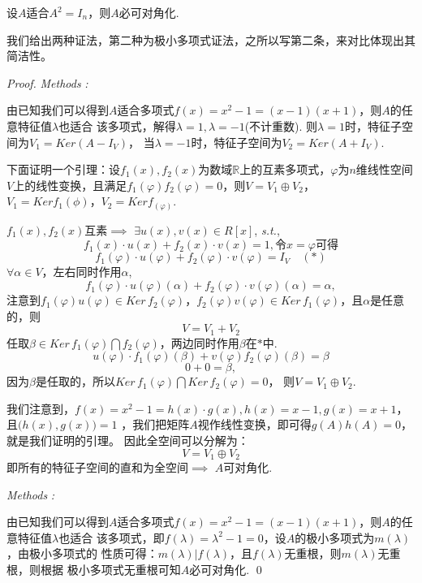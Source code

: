 \begin{proposition}
	设$A$适合$A^2=I_n$，则$A$必可对角化.
\end{proposition}

我们给出两种证法，第二种为极小多项式证法，之所以写第二条，来对比体现出其简洁性。

\begin{proof}
	\emph{Methods\,\,\uppercase\expandafter{}:}

	由已知我们可以得到$A$适合多项式$f(x)=x^2-1=(x-1)(x+1)$，则$A$的任意特征值$\lambda$也适合
	该多项式，解得$\lambda=1,\lambda=-1$(不计重数). 则$\lambda=1$时，特征子空间为$V_1=Ker(A-I_V)$，
	当$\lambda=-1$时，特征子空间为$V_2=Ker (A + I_V)$.

	下面证明一个引理：设$f_1(x),f_2(x)$为数域$\mathbb{R}$上的互素多项式，$\varphi$为$n$维线性空间
	$V$上的线性变换，且满足$f_1(\varphi) f_2(\varphi)=0$，则$V = V_1 \oplus V_2$，$V_1 = Ker f_1(\phi)，
	V_2 = Ker f_(\varphi)$.

	$f_1(x), f_2(x)$互素$\implies $ $\exists u(x),v(x) \in R[x]$, \emph{s.t.},
	$$
	    f_1(x) \cdot u(x) + f_2(x) \cdot v(x) = 1, \text{令$x=\varphi$可得}
	$$
	$$
	f_1(\varphi) \cdot u(\varphi) + f_2(\varphi) \cdot v(\varphi) = I_V  \quad (\ast )
	$$
	$\forall \alpha \in V$，左右同时作用$\alpha$,
	$$
	f_1(\varphi) \cdot u(\varphi)(\alpha) + f_2(\varphi) \cdot v(\varphi)(\alpha) = \alpha,
	$$
	注意到$f_1(\varphi) u(\varphi) \in Ker \, f_2(\varphi)$，$f_2(\varphi) v(\varphi) \in
	Ker \, f_1(\varphi)$，且$\alpha$是任意的，则
	$$
		V = V_1 + V_2
	$$
	任取$\beta \in Ker \, f_1(\varphi) \bigcap f_2(\varphi)$，两边同时作用$\beta$在$\ast $中.
	$$
		u(\varphi) \cdot f_1(\varphi) (\beta) + v(\varphi) f_2(\varphi) (\beta) = \beta
	$$
	$$
		0 + 0 = \beta,
	$$
	因为$\beta$是任取的，所以$Ker \, f_1(\varphi) \bigcap Ker \, f_2(\varphi)=0$，
	则$V=V_1 \oplus  V_2$.

	我们注意到，$f(x)=x^2-1=h(x) \cdot g(x), h(x)=x-1, g(x)=x+1$，且$\bigl( h(x), g(x) \bigr)=1$
	，我们把矩阵$A$视作线性变换，即可得$g(A)h(A)=0$，就是我们证明的引理。 因此全空间可以分解为：
	$$
		V = V_1 \oplus V_2
	$$
	即所有的特征子空间的直和为全空间$\implies $ $A$可对角化.


	\emph{Methods\,\,\uppercase\expandafter{}:}

	由已知我们可以得到$A$适合多项式$f(x)=x^2-1=(x-1)(x+1)$，则$A$的任意特征值$\lambda$也适合
	该多项式，即$f(\lambda)=\lambda^2-1=0$，设$A$的极小多项式为$m(\lambda)$，由极小多项式的
	性质可得：$m(\lambda) | f(\lambda)$，且$f(\lambda)$无重根，则$m(\lambda)$无重根，则根据
	极小多项式无重根可知$A$必可对角化.
	\qed
\end{proof}

